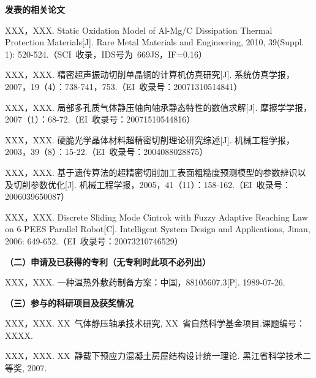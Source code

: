 \begin{publication}
\noindent\textbf{发表的相关论文}
\begin{publist}
\item XXX，XXX. Static Oxidation Model of Al-Mg/C Dissipation Thermal Protection Materials[J]. Rare Metal Materials and Engineering, 2010, 39(Suppl. 1): 520-524.（SCI~收录，IDS号为~669JS，IF=0.16）
\item XXX，XXX. 精密超声振动切削单晶铜的计算机仿真研究[J]. 系统仿真学报，2007，19（4）：738-741，753.（EI~收录号：20071310514841）
\item XXX，XXX. 局部多孔质气体静压轴向轴承静态特性的数值求解[J]. 摩擦学学报，2007（1）：68-72.（EI~收录号：20071510544816）
\item XXX，XXX. 硬脆光学晶体材料超精密切削理论研究综述[J]. 机械工程学报，2003，39（8）：15-22.（EI~收录号：2004088028875）
\item XXX，XXX. 基于遗传算法的超精密切削加工表面粗糙度预测模型的参数辨识以及切削参数优化[J]. 机械工程学报，2005，41（11）：158-162.（EI~收录号：2006039650087）
\item XXX，XXX. Discrete Sliding Mode Cintrok with Fuzzy Adaptive Reaching Law on 6-PEES Parallel Robot[C]. Intelligent System Design and Applications, Jinan, 2006: 649-652.（EI~收录号：20073210746529）
\end{publist}

\noindent\textbf{（二）申请及已获得的专利（无专利时此项不必列出）}
\begin{publist}
\item XXX，XXX. 一种温热外敷药制备方案：中国，88105607.3[P]. 1989-07-26.
\end{publist}

\noindent\textbf{（三）参与的科研项目及获奖情况}
\begin{publist}
\item XXX，XXX. XX~气体静压轴承技术研究, XX~省自然科学基金项目.课题编号：XXXX.
\item XXX，XXX. XX~静载下预应力混凝土房屋结构设计统一理论. 黑江省科学技术二等奖, 2007.
\end{publist}
\end{publication}
